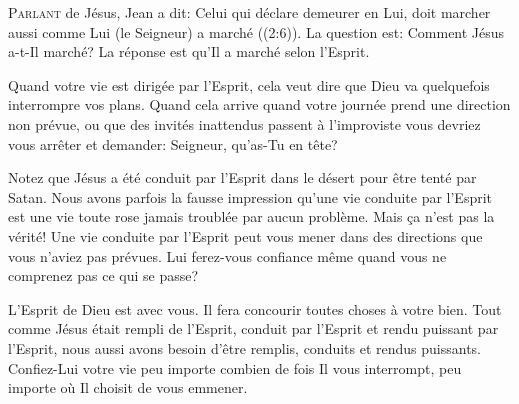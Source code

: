 


\lettrine{P}{arlant} de Jésus, Jean a dit: 
 \Og Celui qui déclare demeurer en Lui, doit marcher aussi comme Lui
 (le Seigneur) a marché \Fg{} ((2:6)). 
 La question est:  \Og Comment Jésus a-t-Il marché? \Fg{}
 La réponse est qu'Il a marché selon l'Esprit. 

Quand votre vie est dirigée par l'Esprit, cela veut dire que Dieu
 va quelquefois interrompre vos plans. Quand cela arrive
 \ocadr quand votre journée prend une direction non prévue,
 ou que des invités inattendus passent à l'improviste \fcadr{}
 vous devriez vous arrêter et demander: 
 \Og Seigneur, qu'as-Tu en tête? \Fg{} 


Notez que Jésus a été conduit par l'Esprit dans le désert pour être tenté
 par Satan. Nous avons parfois la fausse impression qu'une vie conduite
 par l'Esprit est une vie toute rose jamais troublée par aucun problème.
 Mais \c{c}a n'est pas la vérité! Une vie conduite par l'Esprit
 peut vous mener dans des directions que vous n'aviez pas prévues.
 Lui ferez-vous confiance même quand vous ne comprenez pas
 ce qui se passe?

L'Esprit de Dieu est avec vous. Il fera concourir toutes choses à votre bien.
 Tout comme Jésus était rempli de l'Esprit, conduit par l'Esprit
 et rendu puissant par l'Esprit, nous aussi avons besoin d'être remplis,
 conduits et rendus puissants. Confiez-Lui votre vie
 \ocadr peu importe combien de fois Il vous interrompt,
 peu importe où Il choisit de vous emmener.

\dvrule




